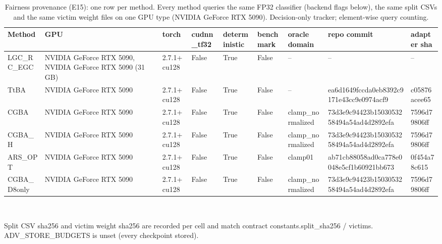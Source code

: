 \begin{table}[t]
\centering\footnotesize
\caption{Fairness provenance (E15): one row per method. Every method queries the same FP32 classifier (backend flags below), the same split CSVs and the same victim weight files on one GPU type (NVIDIA GeForce RTX 5090). Decision-only tracker; element-wise query counting.}
\begin{tabular}{lllllllll}
\toprule
Method & GPU & torch & cudnn\_tf32 & deterministic & benchmark & oracle domain & repo commit & adapter sha
\\
\midrule
LGC_RC_EGC & NVIDIA GeForce RTX 5090, NVIDIA GeForce RTX 5090 (31 GB) & 2.7.1+cu128 & False & True & False & -- & -- & -- \\
TtBA & NVIDIA GeForce RTX 5090 & 2.7.1+cu128 & False & True & False & -- & ea6d1649fccda0eb8392c9171e43cc9e0974acf9 & c05876acee65 \\
CGBA & NVIDIA GeForce RTX 5090 & 2.7.1+cu128 & False & True & False & clamp_normalized & 73d3e9c94423b1503053258494a54ad4d2892efa & 7596d79806ff \\
CGBA_H & NVIDIA GeForce RTX 5090 & 2.7.1+cu128 & False & True & False & clamp_normalized & 73d3e9c94423b1503053258494a54ad4d2892efa & 7596d79806ff \\
ARS_OPT & NVIDIA GeForce RTX 5090 & 2.7.1+cu128 & False & True & False & clamp01 & ab71cb88058ad0ca778e0048e5cf1b60921bb673 & 0f454a78c615 \\
CGBA_D8only & NVIDIA GeForce RTX 5090 & 2.7.1+cu128 & False & True & False & clamp_normalized & 73d3e9c94423b1503053258494a54ad4d2892efa & 7596d79806ff \\
\bottomrule
\end{tabular}
\\[2pt]\parbox{\linewidth}{\scriptsize Split CSV sha256 and victim weight sha256 are recorded per cell and match contract constants.split\_sha256 / victims. ADV\_STORE\_BUDGETS is unset (every checkpoint stored).}
\end{table}

